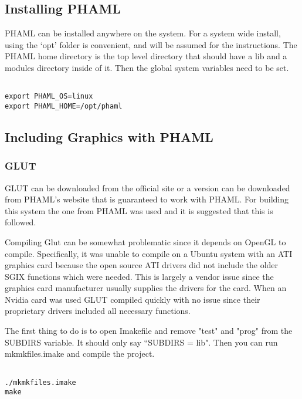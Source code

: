 \subsection{Installing PHAML}
PHAML can be installed anywhere on the system.  For a system wide install, using the `opt' folder is convenient, and will be assumed for the instructions.  The PHAML home directory is the top level directory that should have a lib and a modules directory inside of it.  Then the global system variables need to be set.

\begin{framecode}{6in}
\begin{verbatim}

export PHAML_OS=linux
export PHAML_HOME=/opt/phaml

\end{verbatim}
\end{framecode}

\subsection{Including Graphics with PHAML}
\subsubsection{GLUT}

GLUT can be downloaded from the official site or a version can be downloaded from PHAML's website \cite{PHAML:website} that is guaranteed to work with PHAML.  For building this system the one from PHAML was used and it is suggested that this is followed.

Compiling Glut can be somewhat problematic since it depends on OpenGL to compile.  Specifically, it was unable to compile on a Ubuntu system with an ATI graphics card because the open source ATI drivers did not include the older SGIX functions which were needed.  This is largely a vendor issue since the graphics card manufacturer usually supplies the drivers for the card.  When an Nvidia card was used GLUT compiled quickly with no issue since their proprietary drivers included all necessary functions.

The first thing to do is to open Imakefile and remove "test" and "prog" from the SUBDIRS variable.  It should only say ``SUBDIRS = lib".  Then you can run mkmkfiles.imake and compile the project.
\begin{framecode}{6in}
\begin{verbatim}

./mkmkfiles.imake
make

\end{verbatim}
\end{framecode}

